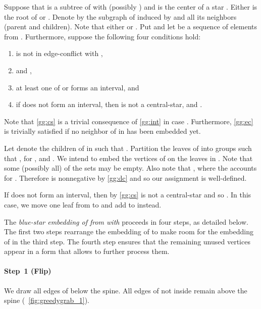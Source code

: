 \documentclass[11pt,a4paper,colorlinks=true,urlcolor=blue,citecolor=red]{article}
\theoremstyle{plain}
\newcommand{\subsubparagraph}[1]{\paragraph{#1}}
\begin{document}
Suppose that  is a subtree of  with  (possibly
) and  is the center of a star .
Either  is the root of  or
. Denote by  the subgraph of 
induced by  and all its neighbors (parent and children). Note
that either  or . Put  and
let  be a sequence of elements from
. Furthermore, suppose the following four conditions
hold:
\begin{enumerate}[label={(BS\arabic*)}]\setlength{\itemindent}{4\labelsep}
  \item\label{gg:ec}  is not in edge-conflict with ,
  \item\label{gg:dc}  and
    ,
  \item\label{gg:int} at least one of  or
     forms an interval, and
  \item\label{gg:cs} if  does not form an
    interval, then  is not a central-star,  and
    .
  \end{enumerate}
Note that \ref{gg:cs} is a trivial consequence of \ref{gg:int} in case
. Furthermore, \ref{gg:ec} is trivially satisfied if no
neighbor of  in  has been embedded yet.

Let  denote the children of  in  such that
. Partition the leaves of 
into  groups  such that ,
for , and . We
intend to embed the vertices of  on the
leaves in . Note that some (possibly all) of the sets  may be
empty. Also note that
, where the
 accounts for . Therefore
 is nonnegative by
\ref{gg:dc} and so our assignment is well-defined.

If  does not form an interval, then by
\ref{gg:cs}  is not a central-star and so . In this case,
we move one leaf from  to  and add  to 
instead.

The \emph{blue-star embedding of  from  with }
proceeds in four steps, as detailed below. The first two steps rearrange
the embedding of  to make room for the embedding of  in the third
step. The fourth step ensures that the remaining unused vertices appear
in a form that allows to further process them.

\subsubparagraph{Step~1 (Flip)} We draw all edges of  below the
spine. All edges of  not inside  remain above the spine
(\figurename~\ref{fig:greedygrab_1}).
\end{document}
